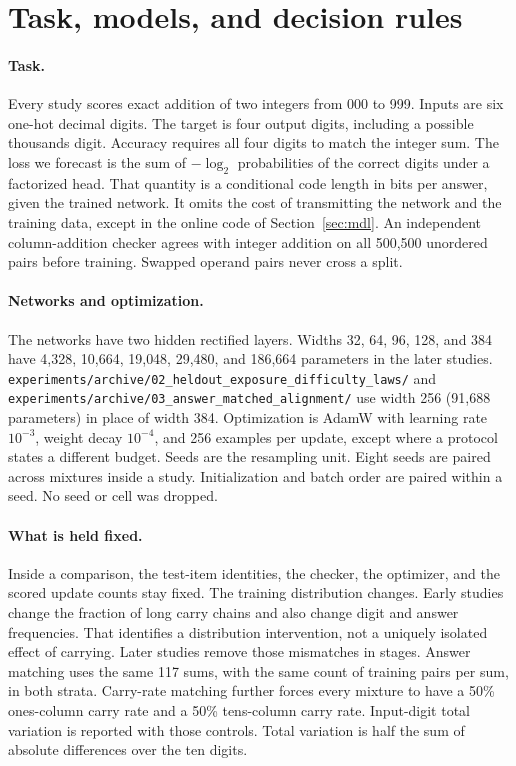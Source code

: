\section{Task, models, and decision rules}
\label{sec:setup}

\paragraph{Task.}
Every study scores exact addition of two integers from 000 to 999.
Inputs are six one-hot decimal digits.
The target is four output digits, including a possible thousands digit.
Accuracy requires all four digits to match the integer sum.
The loss we forecast is the sum of $-\log_2$ probabilities of the correct digits under a factorized head.
That quantity is a conditional code length in bits per answer, given the trained network.
It omits the cost of transmitting the network and the training data, except in the online code of Section~\ref{sec:mdl}.
An independent column-addition checker agrees with integer addition on all 500{,}500 unordered pairs before training.
Swapped operand pairs never cross a split.

\paragraph{Networks and optimization.}
The networks have two hidden rectified layers.
Widths 32, 64, 96, 128, and 384 have 4{,}328, 10{,}664, 19{,}048, 29{,}480, and 186{,}664 parameters in the later studies.
\texttt{experiments/archive/02\_heldout\_exposure\_difficulty\_laws/} and \texttt{experiments/archive/03\_answer\_matched\_alignment/} use width 256 (91{,}688 parameters) in place of width 384.
Optimization is AdamW with learning rate $10^{-3}$, weight decay $10^{-4}$, and 256 examples per update, except where a protocol states a different budget.
Seeds are the resampling unit.
Eight seeds are paired across mixtures inside a study.
Initialization and batch order are paired within a seed.
No seed or cell was dropped.

\paragraph{What is held fixed.}
Inside a comparison, the test-item identities, the checker, the optimizer, and the scored update counts stay fixed.
The training distribution changes.
Early studies change the fraction of long carry chains and also change digit and answer frequencies.
That identifies a distribution intervention, not a uniquely isolated effect of carrying.
Later studies remove those mismatches in stages.
Answer matching uses the same 117 sums, with the same count of training pairs per sum, in both strata.
Carry-rate matching further forces every mixture to have a 50\% ones-column carry rate and a 50\% tens-column carry rate.
Input-digit total variation is reported with those controls.
Total variation is half the sum of absolute differences over the ten digits.


